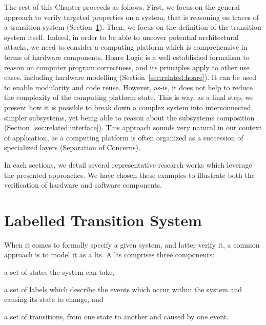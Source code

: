 The rest of this Chapter proceeds as follows.
%
First, we focus on the general approach to verify targeted properties on a
system, that is reasoning on traces of a transition system
(Section~\ref{sec:related:lts}).
%
Then, we focus on the definition of the transition system itself.
%
Indeed, in order to be able to uncover potential architectural attacks, we need
to consider a computing platform which is comprehensive in terms of hardware
components.
%
Hoare Logic is a well established formalism to reason on computer program
correctness, and its principles apply to other use cases, including hardware
modelling (Section~\ref{sec:related:hoare}).
%
It can be used to enable modularity and code reuse.
%
However, as-is, it does not help to reduce the complexity of the computing
platform state.
%
This is way, as a final step, we present how it is possible to break down a
complex system into interconnected, simpler subsystems, yet being able to reason
about the subsystems composition (Section~\ref{sec:related:interface}).
%
This approach sounds very natural in our context of application, as a computing
platform is often organized as a succession of specialized layers (Separation of
Concerns).

In each sections, we detail several representative research works which leverage
the presented approaches.
%
We have chosen these examples to illustrate both the verification of hardware
and software components.

\section{Labelled Transition System} %
\label{sec:related:lts}

When it comes to formally specify a given system, and latter verify it, a common
approach is to model it as a \ac{lts}.
%
A \ac{lts} comprises three components:
%
\begin{inparaenum}[(1)]
%
\item a set of states the system can take,
%
\item a set of labels which describe the events which occur within the system
  and causing its state to change, and
%
\item a set of transitions, from one state to another and caused by one event.
%
\end{inparaenum}

